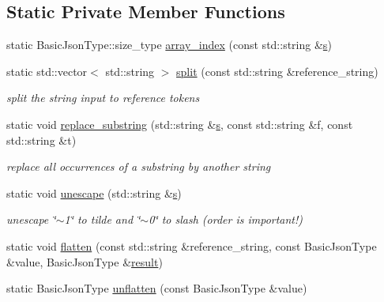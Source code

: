 \subsection*{Static Private Member Functions}
\begin{DoxyCompactItemize}
\item 
static Basic\+Json\+Type\+::size\+\_\+type \hyperlink{classnlohmann_1_1json__pointer_ae28e4b79b9d4fac9e6dca29f47f946fa}{array\+\_\+index} (const std\+::string \&\hyperlink{classnlohmann_1_1json__pointer_a40846302040a443256386bfa258ea061}{s})
\item 
static std\+::vector$<$ std\+::string $>$ \hyperlink{classnlohmann_1_1json__pointer_ae01c32c6a071c2e5198d5dfcce290e50}{split} (const std\+::string \&reference\+\_\+string)
\begin{DoxyCompactList}\small\item\em split the string input to reference tokens \end{DoxyCompactList}\item 
static void \hyperlink{classnlohmann_1_1json__pointer_aa7649d30da9fc10b0e20704a27aea2a9}{replace\+\_\+substring} (std\+::string \&\hyperlink{classnlohmann_1_1json__pointer_a40846302040a443256386bfa258ea061}{s}, const std\+::string \&f, const std\+::string \&t)
\begin{DoxyCompactList}\small\item\em replace all occurrences of a substring by another string \end{DoxyCompactList}\item 
static void \hyperlink{classnlohmann_1_1json__pointer_ab85442d5fbcc289b79beeefc2175446f}{unescape} (std\+::string \&\hyperlink{classnlohmann_1_1json__pointer_a40846302040a443256386bfa258ea061}{s})
\begin{DoxyCompactList}\small\item\em unescape \char`\"{}$\sim$1\char`\"{} to tilde and \char`\"{}$\sim$0\char`\"{} to slash (order is important!) \end{DoxyCompactList}\item 
static void \hyperlink{classnlohmann_1_1json__pointer_ab0d7759d0caa6a0c0187916da28e6ee7}{flatten} (const std\+::string \&reference\+\_\+string, const Basic\+Json\+Type \&value, Basic\+Json\+Type \&\hyperlink{classnlohmann_1_1json__pointer_ae3d35f4085faec07b87c88ba0dae457d}{result})
\item 
static Basic\+Json\+Type \hyperlink{classnlohmann_1_1json__pointer_a920065221e3c81676c3211c100d024a7}{unflatten} (const Basic\+Json\+Type \&value)
\end{DoxyCompactItemize}
